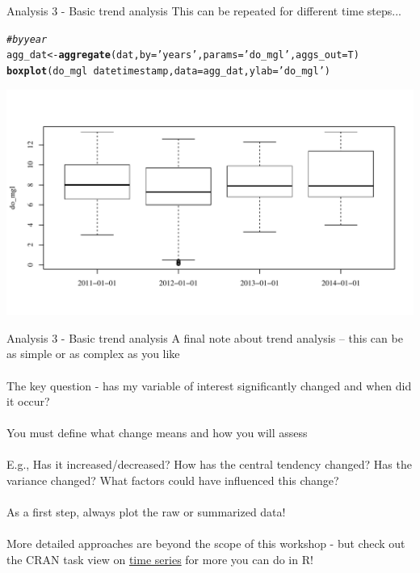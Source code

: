 \documentclass[xcolor=svgnames]{beamer}\usepackage[]{graphicx}\usepackage[]{color}
\makeatletter
\newcommand{\hlstr}[1]{\textcolor[rgb]{0.192,0.494,0.8}{#1}}%
\newcommand{\hlcom}[1]{\textcolor[rgb]{0.678,0.584,0.686}{\textit{#1}}}%
\newcommand{\hlopt}[1]{\textcolor[rgb]{0,0,0}{#1}}%
\newcommand{\hlstd}[1]{\textcolor[rgb]{0.345,0.345,0.345}{#1}}%
\newcommand{\hlkwb}[1]{\textcolor[rgb]{0.69,0.353,0.396}{#1}}%
\newcommand{\hlkwc}[1]{\textcolor[rgb]{0.333,0.667,0.333}{#1}}%
\newcommand{\hlkwd}[1]{\textcolor[rgb]{0.737,0.353,0.396}{\textbf{#1}}}%
\newenvironment{kframe}{%
 \def\at@end@of@kframe{}%
 \ifinner\ifhmode%
  \def\at@end@of@kframe{\end{minipage}}%
  \begin{minipage}{\columnwidth}%
 \fi\fi%
 \def\FrameCommand##1{\hskip\@totalleftmargin \hskip-\fboxsep
 \colorbox{shadecolor}{##1}\hskip-\fboxsep
     \hskip-\linewidth \hskip-\@totalleftmargin \hskip\columnwidth}%
 \MakeFramed {\advance\hsize-\width
   \@totalleftmargin\z@ \linewidth\hsize
   \@setminipage}}%
 {\par\unskip\endMakeFramed%
 \at@end@of@kframe}
\newenvironment{knitrout}{}{} %
\makeatother
\begin{document}
\begin{frame}[containsverbatim]{Analysis 3 - Basic trend analysis}
This can be repeated for different time steps...
\begin{knitrout}\scriptsize
{}\color{fgcolor}\begin{kframe}
\begin{alltt}
\hlcom{# by year}
\hlstd{agg_dat} \hlkwb{<-} \hlkwd{aggregate}\hlstd{(dat,} \hlkwc{by} \hlstd{=} \hlstr{'years'}\hlstd{,} \hlkwc{params} \hlstd{=} \hlstr{'do_mgl'}\hlstd{,} \hlkwc{aggs_out} \hlstd{= T)}
\hlkwd{boxplot}\hlstd{(do_mgl} \hlopt{~} \hlstd{datetimestamp,} \hlkwc{data} \hlstd{= agg_dat,} \hlkwc{ylab} \hlstd{=} \hlstr{'do_mgl'}\hlstd{)}
\end{alltt}
\end{kframe}

{\centering \includegraphics[width=\textwidth]{figure/unnamed-chunk-23} 

}



\end{knitrout}
\end{frame}

\begin{frame}{Analysis 3 - Basic trend analysis}
A final note about trend analysis -- this can be as simple or as complex as you like \\~\\
The key question - has my variable of interest significantly changed and when did it occur? \\~\\
You must define what change means and how you will assess \\~\\
E.g., Has it increased/decreased?  How has the central tendency changed?  Has the variance changed?  What factors could have influenced this change?  \\~\\
As a first step, always plot the raw or summarized data! \\~\\
More detailed approaches are beyond the scope of this workshop - but check out the CRAN task view on \href{http://cran.r-project.org/web/views/TimeSeries.html}{time series} for more you can do in R!
\end{frame}
\end{document}
